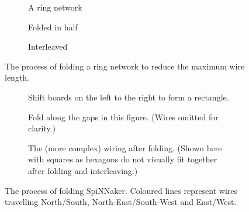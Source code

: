 			\begin{figure}
				\begin{subfigure}[b]{\textwidth}
					\center
					
					\caption{A ring network}
					\label{fig:ringLong}
				\end{subfigure}
				
				\vspace{2ex}
				
				\begin{subfigure}[b]{\textwidth}
					\center
					
					\caption{Folded in half}
					\label{fig:ringFolded}
				\end{subfigure}
				
				\vspace{2ex}
				
				\begin{subfigure}[b]{\textwidth}
					\center
					
					\caption{Interleaved}
					\label{fig:ringInterleaved}
				\end{subfigure}
				
				\caption[Folding a ring network.]{The process of folding a ring network
				to reduce the maximum wire length.}
				\label{fig:folding}
			\end{figure}
			
			\begin{figure}
				\center
				\begin{subfigure}[b]{\textwidth}
					\center
					
					\caption{Shift boards on the left to the right to form a rectangle.}
					\label{fig:boardsFoldedShift}
				\end{subfigure}
				
				\vspace{2ex}
				
				\begin{subfigure}[b]{\textwidth}
					\center
					
					\caption{Fold along the gaps in this figure. (Wires omitted for
					clarity.)}
					\label{fig:boardsFoldedSpaced}
				\end{subfigure}
				
				\vspace{2ex}
				
				\begin{subfigure}[b]{\textwidth}
					\center
					
					\caption{The (more complex) wiring after folding. (Shown here with
					squares as hexagons do not visually fit together after folding and
					interleaving.)}
					\label{fig:boardsFoldedInterleaved}
				\end{subfigure}
				
				\caption[Folding SpiNNaker.]{The process of folding SpiNNaker. Coloured
				lines represent wires travelling {\color{red}North/South},
				{\color{green}North-East/South-West} and {\color{blue}East/West}.}
				\label{fig:boardsFolded}
			\end{figure}
			

